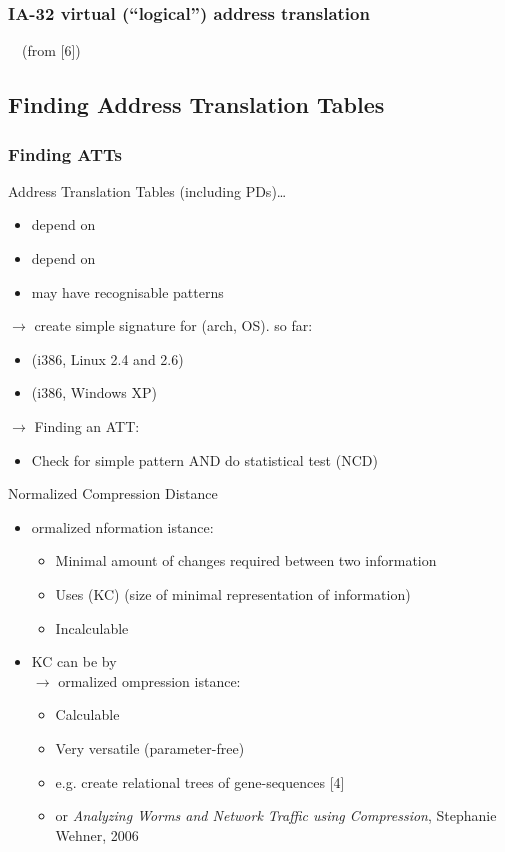 \documentclass{beamer}
\newenvironment{itemizeframe}[1]
  {\begin{frame}{#1}\startitemizeframe}
  {\stopitemizeframe\end{frame}}
\newcommand\startitemizeframe{\begin{itemize}}
\newcommand\stopitemizeframe{\end{itemize}}
\begin{document}
		\begin{frame} \frametitle{IA-32 virtual (``logical'') address translation}
			 ~~(from [6])
		\end{frame}

	\subsection{Finding Address Translation Tables}
		
		\begin{frame} \frametitle{Finding ATTs}
			Address Translation Tables (including PDs)\ldots
			\begin{itemize}
				\item depend on 
				\item depend on 
				\item may have recognisable patterns
			\end{itemize}
			$\rightarrow$ create simple signature for (arch, OS). so far:
			\begin{itemize}
				\item (i386, Linux 2.4 and 2.6)
				\item (i386, Windows XP)
			\end{itemize}
			$\rightarrow$ Finding an ATT:
			\begin{itemize}
				\item Check for simple pattern AND do statistical test (NCD)
			\end{itemize}
		\end{frame}

		\begin{itemizeframe}{Normalized Compression Distance}
			\item {}ormalized nformation istance:
			\begin{itemize}
				\item Minimal amount of changes required between two information
				\item Uses  (KC) (size of minimal representation of information)
				\item Incalculable
			\end{itemize}
			\item KC can be  by  \\
				$\rightarrow$ ormalized ompression istance:
			\begin{itemize}
				\item Calculable
				\item Very versatile (parameter-free)
				\item e.g. create relational trees of gene-sequences [4]
				\item or \emph{Analyzing Worms and Network Traffic using Compression}, Stephanie Wehner, 2006
			\end{itemize}
		\end{itemizeframe}
\end{document}
